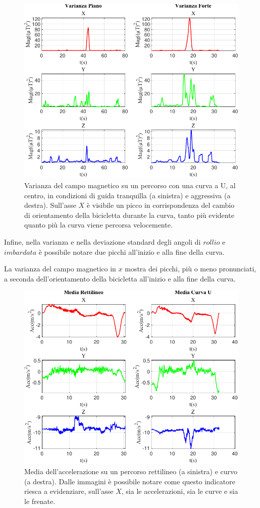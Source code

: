\documentclass[class=article]{standalone}
\begin{document}
	\begin{center}
		\begin{figure}[h!]
			\centering\includegraphics[width=.7\textwidth]{img/curvaUFP/Mag/Varianza}
			\caption[]{Varianza del campo magnetico su un percorso con una curva a U, al centro, in condizioni di guida tranquilla (a sinistra) e aggressiva (a destra). Sull'asse \(X\) è visibile un picco in corrispondenza del cambio di orientamento della bicicletta durante la curva, tanto più evidente quanto più la curva viene percorsa velocemente.}
			\label{fig:MagVar_curvaUFP}
		\end{figure}
	\end{center}
	
	Infine, nella varianza e nella deviazione standard degli angoli di \(rollio\) e \(imbardata\) è possibile notare due picchi all'inizio e alla fine della curva.\hfill\break
	
	La varianza del campo magnetico in \(x\) mostra dei picchi, più o meno pronunciati, a seconda dell'orientamento della bicicletta all'inizio e alla fine della curva.
	
	\begin{center}
		\begin{figure}[h!]
			\centering\includegraphics[width=.7\textwidth]{img/LungaCurvaU/Acc/Media}
			\caption[]{Media dell'accelerazione su un percorso rettilineo (a sinistra) e curvo (a destra). Dalle immagini è possibile notare come questo indicatore riesca a evidenziare, sull'asse \(X\), sia le accelerazioni, sia le curve e sia le frenate.}
			\label{fig:AccMedia_LungaCurvaU}
		\end{figure}
	\end{center}
	
\end{document}
